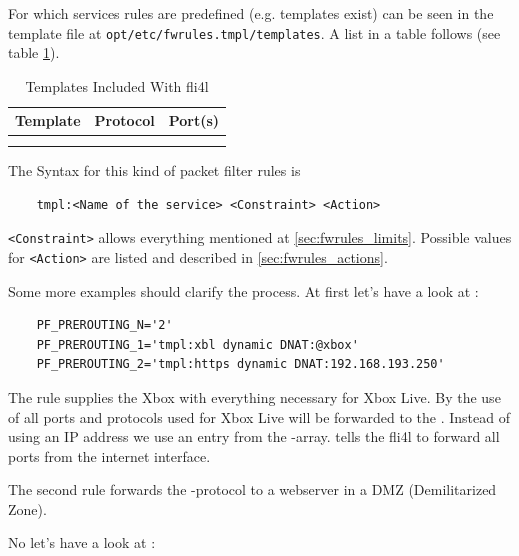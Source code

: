 For which services rules are predefined (e.g. templates exist) can be seen
in the template file at \verb+opt/etc/fwrules.tmpl/templates+. A list in a table
follows (see table \ref{tab:fwrules_tmpl}).

\begin{center}
  {\footnotesize
  \begin{longtable}{|lll|}
     \hline
     {\textbf{Template}} & {\textbf{Protocol}} & {\textbf{Port(s)}} \\
     \hline\hline
     \endhead
      \\
     \caption{Templates Included With fli4l}
     \label{tab:fwrules_tmpl}
  \end{longtable}}
\end{center}

The Syntax for this kind of packet filter rules is

\begin{example}
\begin{verbatim}
    tmpl:<Name of the service> <Constraint> <Action>
\end{verbatim}
\end{example}

\verb+<Constraint>+ allows everything mentioned at \ref{sec:fwrules_limits}.
Possible values for \verb+<Action>+ are listed and described 
in \ref{sec:fwrules_actions}.

Some more examples should clarify the process. At first let's have a look at :

\begin{example}
\begin{verbatim}
    PF_PREROUTING_N='2'
    PF_PREROUTING_1='tmpl:xbl dynamic DNAT:@xbox'
    PF_PREROUTING_2='tmpl:https dynamic DNAT:192.168.193.250'
\end{verbatim}
\end{example}

The rule  supplies the Xbox with everything necessary
for Xbox Live. By the use of  all ports and protocols used
for Xbox Live will be forwarded to the . Instead of using an IP
address we use an entry from the -array. 
tells the fli4l to forward all ports from the internet interface.

The second rule forwards the -protocol to a webserver in a DMZ
(Demilitarized Zone).

No let's have a look at :

